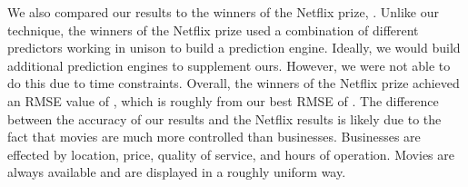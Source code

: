 We also compared our results to the winners of the Netflix prize,
\cite{netprize}. Unlike our technique, the winners of the Netflix prize used a
combination of different predictors working in unison to build a prediction
engine. Ideally, we would build additional prediction engines to supplement
ours. However, we were not able to do this due to time constraints. Overall,
the winners of the Netflix prize achieved an RMSE value of \bestNetflixRMSE,
which is roughly \netDiff from our best RMSE of \bestRMSE. The difference
between the accuracy of our results and the Netflix results is likely due to
the fact that movies are much more controlled than businesses. Businesses are
effected by location, price, quality of service, and hours of operation. Movies
are always available and are displayed in a roughly uniform way. 


